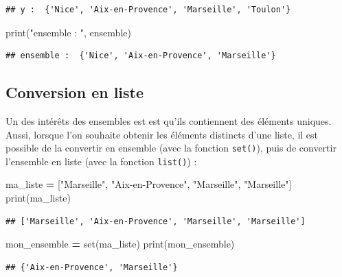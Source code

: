 \documentclass[12pt,]{book}
\newenvironment{Shaded}{\begin{snugshade}}{\end{snugshade}}
\newcommand{\StringTok}[1]{\textcolor[rgb]{0.31,0.60,0.02}{#1}}
\newcommand{\OperatorTok}[1]{\textcolor[rgb]{0.81,0.36,0.00}{\textbf{#1}}}
\newcommand{\BuiltInTok}[1]{#1}
\newcommand{\NormalTok}[1]{#1}
\numberwithin{equation}{section}
\numberwithin{countremarque}{section}
\begin{document}
\begin{lstlisting}
## y :  {'Nice', 'Aix-en-Provence', 'Marseille', 'Toulon'}
\end{lstlisting}

\begin{Shaded}
\begin{Highlighting}[]
\BuiltInTok{print}\NormalTok{(}\StringTok{"ensemble : "}\NormalTok{, ensemble)}
\end{Highlighting}
\end{Shaded}

\begin{lstlisting}
## ensemble :  {'Nice', 'Aix-en-Provence', 'Marseille'}
\end{lstlisting}

\subsection{Conversion en liste}\label{conversion-en-liste}

Un des intérêts des ensembles est est qu'ils contiennent des éléments
uniques. Aussi, lorsque l'on souhaite obtenir les éléments distincts
d'une liste, il est possible de la convertir en ensemble (avec la
fonction \texttt{set()}), puis de convertir l'ensemble en liste (avec la
fonction \texttt{list()}) :

\begin{Shaded}
\begin{Highlighting}[]
\NormalTok{ma_liste }\OperatorTok{=}\NormalTok{ [}\StringTok{"Marseille"}\NormalTok{, }\StringTok{"Aix-en-Provence"}\NormalTok{, }\StringTok{"Marseille"}\NormalTok{, }\StringTok{"Marseille"}\NormalTok{]}
\BuiltInTok{print}\NormalTok{(ma_liste)}
\end{Highlighting}
\end{Shaded}

\begin{lstlisting}
## ['Marseille', 'Aix-en-Provence', 'Marseille', 'Marseille']
\end{lstlisting}

\begin{Shaded}
\begin{Highlighting}[]
\NormalTok{mon_ensemble }\OperatorTok{=} \BuiltInTok{set}\NormalTok{(ma_liste)}
\BuiltInTok{print}\NormalTok{(mon_ensemble)}
\end{Highlighting}
\end{Shaded}

\begin{lstlisting}
## {'Aix-en-Provence', 'Marseille'}
\end{lstlisting}
\end{document}
